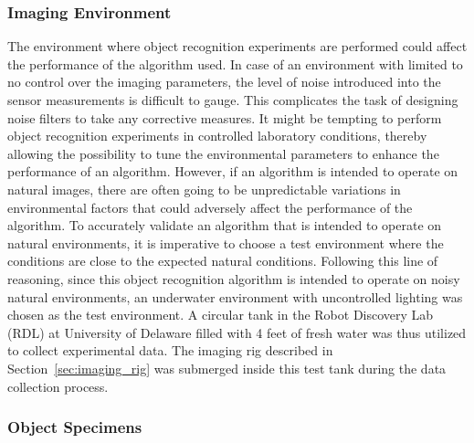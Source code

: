 \subsubsection{Imaging Environment}


The environment where object recognition experiments are performed could affect the performance of the algorithm used. In case of an environment with limited to no control over the imaging parameters, the level of noise introduced into the sensor measurements is difficult to gauge. This complicates the task of designing noise filters to take any corrective measures. It might be tempting to perform object recognition experiments in controlled laboratory conditions, thereby allowing the possibility to tune the environmental parameters to enhance the performance of an algorithm. However, if an algorithm is intended to operate on natural images, there are often going to be unpredictable variations in environmental factors that could adversely affect the performance of the algorithm. To accurately validate an algorithm that is intended to operate on natural environments, it is imperative to choose a 
test environment where the conditions are close to the expected natural conditions. Following this line of reasoning, since this object recognition algorithm is intended to operate on noisy natural environments, an underwater environment with uncontrolled lighting was chosen as the test environment. A circular tank in the Robot Discovery Lab (RDL) at University of Delaware filled with 4 feet of fresh water was thus utilized to collect experimental data. The imaging rig described in Section~\ref{sec:imaging_rig} was submerged inside this test tank during the data collection process.

\subsubsection{Object Specimens}


